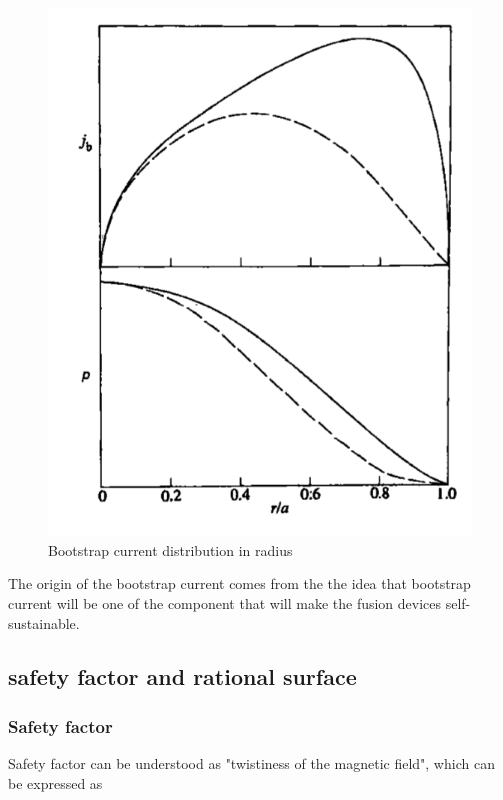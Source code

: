 \begin{figure}[h] \centering
        \includegraphics[width=1\textwidth]{Image/BS_current.png}
        \caption{Bootstrap current distribution in radius}
        \label{fig:j_bs}
\end{figure}


The origin of the bootstrap current comes from the the idea that bootstrap current will be one of the component that will make the fusion devices self-sustainable. 


\subsection{safety factor and rational surface}

\subsubsection{Safety factor}

Safety factor can be understood as "twistiness of the magnetic field", which can be expressed as 

